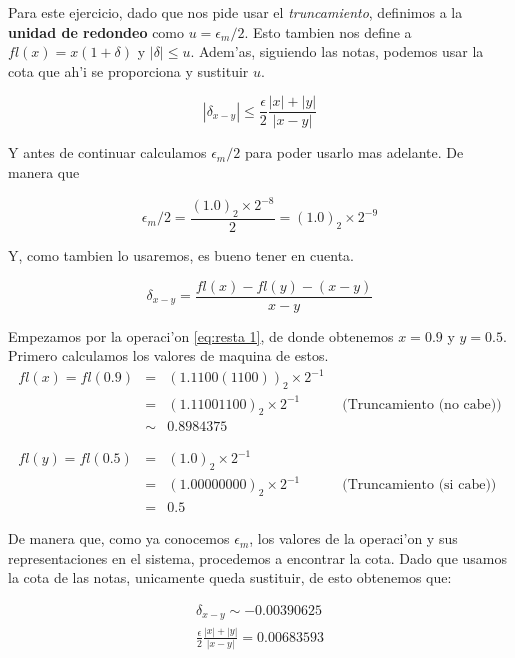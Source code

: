\documentclass[11pt]{article}
\begin{document}
Para este ejercicio, dado que nos pide usar el \textit{truncamiento},
definimos a la \textbf{unidad de redondeo} como \(u = \epsilon_m/2\).
Esto tambien nos define a \(fl(x)=x(1+\delta)\) y \(|\delta| \leq u\).
Adem'as, siguiendo las notas, podemos usar la cota que ah'i se
proporciona y sustituir \(u\).

\begin{equation} |\delta_{x-y}| \leq \frac{\epsilon}{2}\frac{|x|+|y|}{|x-y|} \label{eq:cota}
\end{equation}

Y antes de continuar calculamos \(\epsilon_m/2\) para poder usarlo mas
adelante. De manera que

\begin{equation*} \epsilon_m/2 = \frac{(1.0)_2 \times 2^{-8}}{2} = (1.0)_2 \times 2^{-9}
\end{equation*}

Y, como tambien lo usaremos, es bueno tener en cuenta.

\begin{equation*} \delta_{x-y} = \frac{fl(x)-fl(y) - (x-y)}{x-y}
\end{equation*}

    Empezamos por la operaci'on \ref{eq:resta 1}, de donde obtenemos
\(x=0.9\) y \(y=0.5\). Primero calculamos los valores de maquina de
estos. \begin{eqnarray*}
     fl(x) = fl(0.9) &=& (1.1100(1100))_2\times 2^{-1} \\
             &=& (1.11001100)_2\times 2^{-1}  \quad\quad\quad \text{(Truncamiento (no cabe))} \\
             &\sim& 0.8984375
            \\ & & \\ & & \\
     fl(y) = fl(0.5) &=& (1.0)_2\times 2^{-1} \\
             &=& (1.00000000)_2\times 2^{-1}  \quad\quad\quad \text{(Truncamiento (si cabe))} \\
             &=& 0.5
 \end{eqnarray*}

De manera que, como ya conocemos \(\epsilon_m\), los valores de la
operaci'on y sus representaciones en el sistema, procedemos a encontrar
la cota. Dado que usamos la cota de las notas, unicamente queda
sustituir, de esto obtenemos que:

\begin{eqnarray*}
    \delta_{x-y} \sim -0.00390625 \\
    \frac{\epsilon}{2}\frac{|x|+|y|}{|x-y|} = 0.00683593
\end{eqnarray*}
\end{document}
